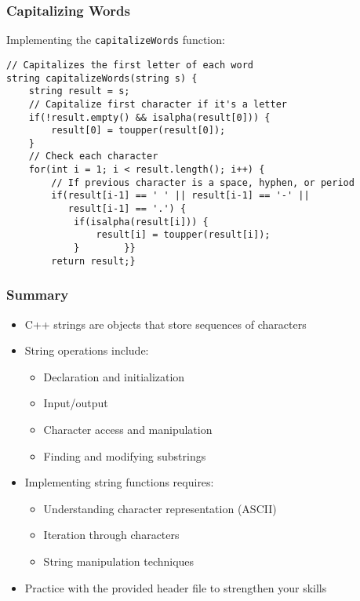 \documentclass{beamer}
\begin{document}
\begin{frame}[fragile]
    \frametitle{Capitalizing Words}
    
    Implementing the \texttt{capitalizeWords} function:
    
    \begin{lstlisting}
// Capitalizes the first letter of each word
string capitalizeWords(string s) {
    string result = s;    
    // Capitalize first character if it's a letter
    if(!result.empty() && isalpha(result[0])) {
        result[0] = toupper(result[0]);
    }    
    // Check each character
    for(int i = 1; i < result.length(); i++) {
        // If previous character is a space, hyphen, or period
        if(result[i-1] == ' ' || result[i-1] == '-' || 
           result[i-1] == '.') {
            if(isalpha(result[i])) {
                result[i] = toupper(result[i]);
            }        }}
        return result;}
    \end{lstlisting}
\end{frame}

\begin{frame}
    \frametitle{Summary}
    
    \begin{itemize}
        \item C++ strings are objects that store sequences of characters
        \item String operations include:
        \begin{itemize}
            \item Declaration and initialization
            \item Input/output
            \item Character access and manipulation
            \item Finding and modifying substrings
        \end{itemize}
        \item Implementing string functions requires:
        \begin{itemize}
            \item Understanding character representation (ASCII)
            \item Iteration through characters
            \item String manipulation techniques
        \end{itemize}
        \item Practice with the provided header file to strengthen your skills
    \end{itemize}
\end{frame}
\end{document}
